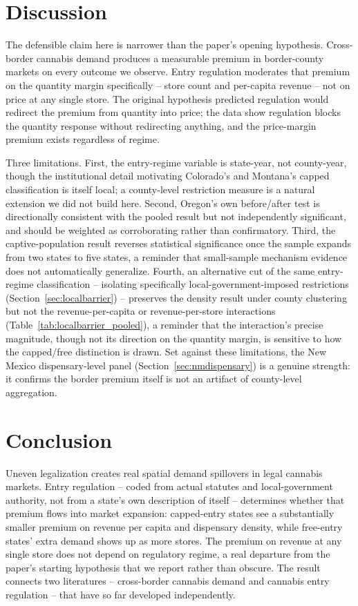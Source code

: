 \documentclass[12pt]{article}
\begin{document}
\section{Discussion}
\label{sec:discussion}

The defensible claim here is narrower than the paper's opening hypothesis. Cross-border cannabis demand
produces a measurable premium in border-county markets on every outcome we observe. Entry regulation
moderates that premium on the quantity margin specifically -- store count and per-capita revenue -- not on
price at any single store. The original hypothesis predicted regulation would redirect the premium from
quantity into price; the data show regulation blocks the quantity response without redirecting anything, and
the price-margin premium exists regardless of regime.

Three limitations. First, the entry-regime variable is state-year, not county-year, though the institutional
detail motivating Colorado's and Montana's capped classification is itself local; a county-level restriction
measure is a natural extension we did not build here. Second, Oregon's own before/after test is directionally
consistent with the pooled result but not independently significant, and should be weighted as corroborating
rather than confirmatory. Third, the captive-population result reverses statistical significance once the
sample expands from two states to five states, a reminder that small-sample mechanism evidence does not
automatically generalize. Fourth, an alternative cut of the same entry-regime classification -- isolating
specifically local-government-imposed restrictions (Section~\ref{sec:localbarrier}) -- preserves the density
result under county clustering but not the revenue-per-capita or revenue-per-store interactions
(Table~\ref{tab:localbarrier_pooled}), a reminder that the interaction's precise magnitude, though not its
direction on the quantity margin, is sensitive to how the capped/free distinction is drawn. Set against these
limitations, the New Mexico dispensary-level panel (Section~\ref{sec:nmdispensary}) is a genuine strength: it
confirms the border premium itself is not an artifact of county-level aggregation.

\section{Conclusion}
\label{sec:conclusion}

Uneven legalization creates real spatial demand spillovers in legal cannabis markets. Entry regulation --
coded from actual statutes and local-government authority, not from a state's own description of itself --
determines whether that premium flows into market expansion: capped-entry states see a substantially smaller
premium on revenue per capita and dispensary density, while free-entry states' extra demand shows up as more
stores. The premium on revenue at any single store does not depend on regulatory regime, a real departure from
the paper's starting hypothesis that we report rather than obscure. The result connects two literatures --
cross-border cannabis demand and cannabis entry regulation -- that have so far developed independently.



\end{document}
